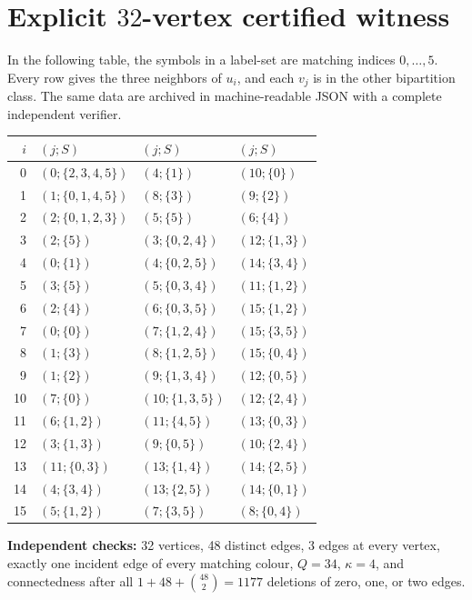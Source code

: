 \documentclass[11pt]{article}
\newcommand{\kk}{\kappa}
\begin{document}
\appendix
\section{Explicit $32$-vertex certified witness}\label{sec:certificate}
In the following table, the symbols in a label-set are matching indices $0,\ldots,5$. Every row gives the three neighbors of $u_i$, and each $v_j$ is in the other bipartition class. The same data are archived in machine-readable JSON with a complete independent verifier.
\begin{center}\small
\begin{tabular}{rlll}\toprule
$i$ & $(j;S)$ & $(j;S)$ & $(j;S)$\\\midrule
0 & $(0;\{2,3,4,5\})$ & $(4;\{1\})$ & $(10;\{0\})$\\
1 & $(1;\{0,1,4,5\})$ & $(8;\{3\})$ & $(9;\{2\})$\\
2 & $(2;\{0,1,2,3\})$ & $(5;\{5\})$ & $(6;\{4\})$\\
3 & $(2;\{5\})$ & $(3;\{0,2,4\})$ & $(12;\{1,3\})$\\
4 & $(0;\{1\})$ & $(4;\{0,2,5\})$ & $(14;\{3,4\})$\\
5 & $(3;\{5\})$ & $(5;\{0,3,4\})$ & $(11;\{1,2\})$\\
6 & $(2;\{4\})$ & $(6;\{0,3,5\})$ & $(15;\{1,2\})$\\
7 & $(0;\{0\})$ & $(7;\{1,2,4\})$ & $(15;\{3,5\})$\\
8 & $(1;\{3\})$ & $(8;\{1,2,5\})$ & $(15;\{0,4\})$\\
9 & $(1;\{2\})$ & $(9;\{1,3,4\})$ & $(12;\{0,5\})$\\
10 & $(7;\{0\})$ & $(10;\{1,3,5\})$ & $(12;\{2,4\})$\\
11 & $(6;\{1,2\})$ & $(11;\{4,5\})$ & $(13;\{0,3\})$\\
12 & $(3;\{1,3\})$ & $(9;\{0,5\})$ & $(10;\{2,4\})$\\
13 & $(11;\{0,3\})$ & $(13;\{1,4\})$ & $(14;\{2,5\})$\\
14 & $(4;\{3,4\})$ & $(13;\{2,5\})$ & $(14;\{0,1\})$\\
15 & $(5;\{1,2\})$ & $(7;\{3,5\})$ & $(8;\{0,4\})$\\
\bottomrule\end{tabular}
\end{center}
\noindent\textbf{Independent checks:} 32 vertices, 48 distinct edges, 3 edges at every vertex, exactly one incident edge of every matching colour, $Q=34$, $\kk=4$, and connectedness after all $1+48+\binom{48}{2}=1177$ deletions of zero, one, or two edges.
\end{document}
